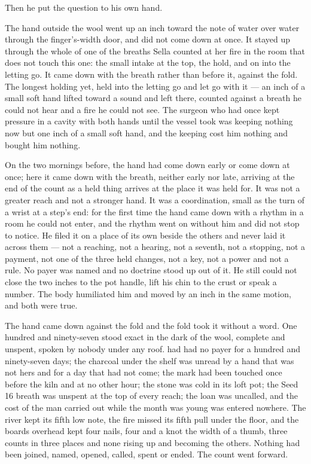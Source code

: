 \scenebreak

Then he put the question to his own hand.

The hand outside the wool went up an inch toward the note of water over water through the finger's-width door, and did not come down at once. It stayed up through the whole of one of the breaths Sella counted at her fire in the room that does not touch this one: the small intake at the top, the hold, and on into the letting go. It came down with the breath rather than before it, against the fold. The longest holding yet, held into the letting go and let go with it --- an inch of a small soft hand lifted toward a sound and left there, counted against a breath he could not hear and a fire he could not see. The surgeon who had once kept pressure in a cavity with both hands until the vessel took was keeping nothing now but one inch of a small soft hand, and the keeping cost him nothing and bought him nothing.

On the two mornings before, the hand had come down early or come down at once; here it came down with the breath, neither early nor late, arriving at the end of the count as a held thing arrives at the place it was held for. It was not a greater reach and not a stronger hand. It was a coordination, small as the turn of a wrist at a step's end: for the first time the hand came down with a rhythm in a room he could not enter, and the rhythm went on without him and did not stop to notice. He filed it on a place of its own beside the others and never laid it across them --- not a reaching, not a hearing, not a seventh, not a stopping, not a payment, not one of the three held changes, not a key, not a power and not a rule. No payer was named and no doctrine stood up out of it. He still could not close the two inches to the pot handle, lift his chin to the crust or speak a number. The body humiliated him and moved by an inch in the same motion, and both were true.

The hand came down against the fold and the fold took it without a word. One hundred and ninety-seven stood exact in the dark of the wool, complete and unspent, spoken by nobody under any roof.  had had no payer for a hundred and ninety-seven days; the charcoal under the shelf was unread by a hand that was not hers and for a day that had not come; the mark had been touched once before the kiln and at no other hour; the stone was cold in its loft pot; the Seed 16 breath was unspent at the top of every reach; the loan was uncalled, and the cost of the man carried out while the month was young was entered nowhere. The river kept its fifth low note, the fire missed its fifth pull under the floor, and the boards overhead kept four nails, four and a knot the width of a thumb, three counts in three places and none rising up and becoming the others. Nothing had been joined, named, opened, called, spent or ended. The count went forward.

